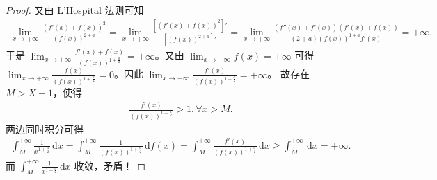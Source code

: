 \documentclass[../../main.tex]{subfiles}%
\begin{document}
\begin{proof}
又由 L'Hospital 法则可知
\begin{align*}
\lim_{x \to +\infty} \frac{\left( f'(x) + f(x) \right)^2}{\left( f(x) \right)^{2 + a}} = \lim_{x \to +\infty} \frac{\left[ \left( f'(x) + f(x) \right)^2 \right]'}{\left[ \left( f(x) \right)^{2 + a} \right]'} = \lim_{x \to +\infty} \frac{\left( f''(x) + f'(x) \right) \left( f'(x) + f(x) \right)}{(2 + a) \left( f(x) \right)^{1 + a} f'(x)} = +\infty.
\end{align*}
于是 \( \lim_{x \to +\infty} \frac{f'(x) + f(x)}{\left( f(x) \right)^{1 + \frac{a}{2}}} = +\infty \)。又由 \( \lim_{x \to +\infty} f(x) = +\infty \) 可得 \( \lim_{x \to +\infty} \frac{f(x)}{\left( f(x) \right)^{1 + \frac{a}{2}}} = 0 \)。因此 \( \lim_{x \to +\infty} \frac{f'(x)}{\left( f(x) \right)^{1 + \frac{a}{2}}} = +\infty \)。
故存在 \( M > X + 1 \)，使得
\begin{align*}
\frac{f'(x)}{\left( f(x) \right)^{1 + \frac{a}{2}}} > 1, \forall x > M.
\end{align*}
两边同时积分可得
\begin{align*}
\int_M^{+\infty} \frac{1}{x^{1 + \frac{a}{2}}} \, \mathrm{d}x = \int_M^{+\infty} \frac{1}{\left( f(x) \right)^{1 + \frac{a}{2}}} \, \mathrm{d}f(x) = \int_M^{+\infty} \frac{f'(x)}{\left( f(x) \right)^{1 + \frac{a}{2}}} \, \mathrm{d}x \geqslant  \int_M^{+\infty} \, \mathrm{d}x = +\infty.
\end{align*}
而 \( \int_M^{+\infty} \frac{1}{x^{1 + \frac{a}{2}}} \, \mathrm{d}x \) 收敛，矛盾！

\end{proof}

\vspace{0.5cm}
\end{document}
